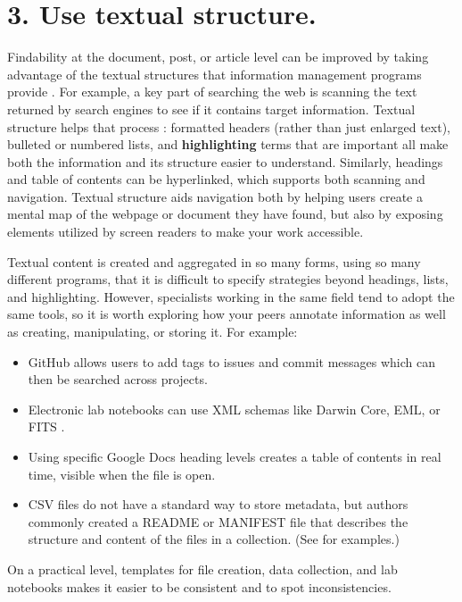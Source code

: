 \documentclass[10pt,letterpaper]{article}
\newcommand{\rulemajor}[1]{\section*{#1}}
\begin{document}
\rulemajor{3. Use textual structure.}

Findability at the document, post, or article level can be improved by taking
advantage of the textual structures that information management programs provide
\cite{Hedden2016}. For example, a key part of searching the web is scanning the
text returned by search engines to see if it contains target information.
Textual structure helps that process \cite{Krug2014}: formatted headers (rather
than just enlarged text), bulleted or numbered lists, and \textbf{highlighting}
terms that are important all make both the information and its structure easier
to understand. Similarly, headings and table of contents can be hyperlinked,
which supports both scanning and navigation. Textual structure aids navigation
both by helping users create a mental map of the webpage or document they have
found, but also by exposing elements utilized by screen readers to make your
work accessible.

Textual content is created and aggregated in so many forms, using so many
different programs, that it is difficult to specify strategies beyond headings,
lists, and highlighting. However, specialists working in the same field tend to
adopt the same tools, so it is worth exploring how your peers annotate
information as well as creating, manipulating, or storing it. For example:

\begin{itemize}

\item
  GitHub allows users to add tags to issues and commit messages which can then
  be searched across projects.

\item
  Electronic lab notebooks can use XML schemas like Darwin Core, EML, or FITS
  \cite{Briney2015}.

\item
  Using specific Google Docs heading levels creates a table of contents in real
  time, visible when the file is open.

\item
  CSV files do not have a standard way to store metadata, but authors commonly
  created a README or MANIFEST file that describes the structure and content of
  the files in a collection. (See \cite{Pudding} for examples.)

\end{itemize}

On a practical level, templates for file creation, data collection, and lab
notebooks makes it easier to be consistent and to spot inconsistencies.
\end{document}
